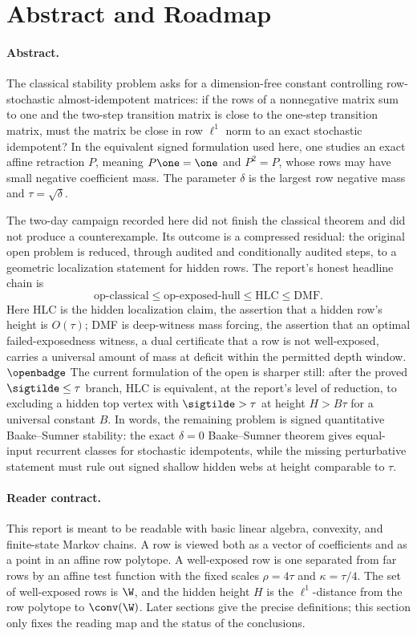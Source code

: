 \section{Abstract and Roadmap}

\paragraph{Abstract.}
The classical stability problem asks for a dimension-free constant controlling
row-stochastic almost-idempotent matrices: if the rows of a nonnegative
matrix sum to one and the two-step transition matrix is close to the one-step
transition matrix, must the matrix be close in row \(\ell^1\) norm to an
exact stochastic idempotent?  In the equivalent signed formulation used here,
one studies an exact affine retraction \(P\), meaning \(P\one=\one\) and
\(P^2=P\), whose rows may have small negative coefficient mass.  The parameter
\(\delta\) is the largest row negative mass and \(\tau=\sqrt{\delta}\).

The two-day campaign recorded here did not finish the classical theorem and
did not produce a counterexample.  Its outcome is a compressed residual: the
original open problem is reduced, through audited and conditionally audited
steps, to a geometric localization statement for hidden rows.  The report's
honest headline chain is
\[
  \mathrm{op}\text{-classical}
  \leq
  \mathrm{op}\text{-exposed-hull}
  \leq
  \mathrm{HLC}
  \leq
  \mathrm{DMF}.
\]
Here HLC is the hidden localization claim, the assertion that a hidden row's
height is \(O(\tau)\); DMF is deep-witness mass forcing, the assertion that an
optimal failed-exposedness witness, a dual certificate that a row is not
well-exposed, carries a universal amount of mass at deficit within the
permitted depth window.  \(\openbadge\) The current formulation of the open is
sharper still: after the proved \(\sigtilde\le\tau\) branch, HLC is equivalent,
at the report's level of reduction, to excluding a hidden top vertex with
\(\sigtilde>\tau\) at height \(H>B\tau\) for a universal constant \(B\).  In
words, the remaining problem is signed quantitative Baake--Sumner stability:
the exact \(\delta=0\) Baake--Sumner theorem gives equal-input recurrent
classes for stochastic idempotents, while the missing perturbative statement
must rule out signed shallow hidden webs at height comparable to \(\tau\).

\paragraph{Reader contract.}
This report is meant to be readable with basic linear algebra, convexity, and
finite-state Markov chains.  A row is viewed both as a vector of coefficients
and as a point in an affine row polytope.  A well-exposed row is one separated
from far rows by an affine test function with the fixed scales
\(\rho=4\tau\) and \(\kappa=\tau/4\).  The set of well-exposed rows is
\(\W\), and the hidden height \(H\) is the \(\ell^1\)-distance from the row
polytope to \(\conv(\W)\).  Later sections give the precise definitions; this
section only fixes the reading map and the status of the conclusions.

